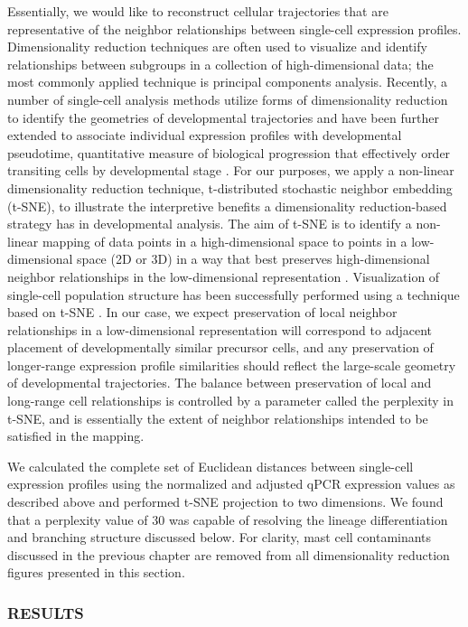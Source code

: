 \begin{subappendices}
Essentially, we would like to reconstruct cellular trajectories that are representative of the neighbor relationships between single-cell expression profiles. Dimensionality reduction techniques are often used to visualize and identify relationships between subgroups in a collection of high-dimensional data; the most commonly applied technique is principal components analysis. Recently, a number of single-cell analysis methods utilize forms of dimensionality reduction to identify the geometries of developmental trajectories and have been further extended to associate individual expression profiles with developmental pseudotime, quantitative measure of biological progression that effectively order transiting cells by developmental stage \cite{trapnell2015}. For our purposes, we apply a non-linear dimensionality reduction technique, t-distributed stochastic neighbor embedding (t-SNE), to illustrate the interpretive benefits a dimensionality reduction-based strategy has in developmental analysis. The aim of t-SNE is to identify a non-linear mapping of data points in a high-dimensional space to points in a low-dimensional space (2D or 3D) in a way that best preserves high-dimensional neighbor relationships in the low-dimensional representation \cite{maaten2008}. Visualization of single-cell population structure has been successfully performed using a technique based on t-SNE \cite{amir2013}. In our case, we expect preservation of local neighbor relationships in a low-dimensional representation will correspond to adjacent placement of developmentally similar precursor cells, and any preservation of longer-range expression profile similarities should reflect the large-scale geometry of developmental trajectories. The balance between preservation of local and long-range cell relationships is controlled by a parameter called the perplexity in t-SNE, and is essentially the extent of neighbor relationships intended to be satisfied in the mapping. 

We calculated the complete set of Euclidean distances between single-cell expression profiles using the normalized and adjusted qPCR expression values as described above and performed t-SNE projection to two dimensions. We found that a perplexity value of 30 was capable of resolving the lineage differentiation and branching structure discussed below. For clarity, mast cell contaminants discussed in the previous chapter are removed from all dimensionality reduction figures presented in this section. 

\subsubsection{RESULTS}


\end{subappendices}

